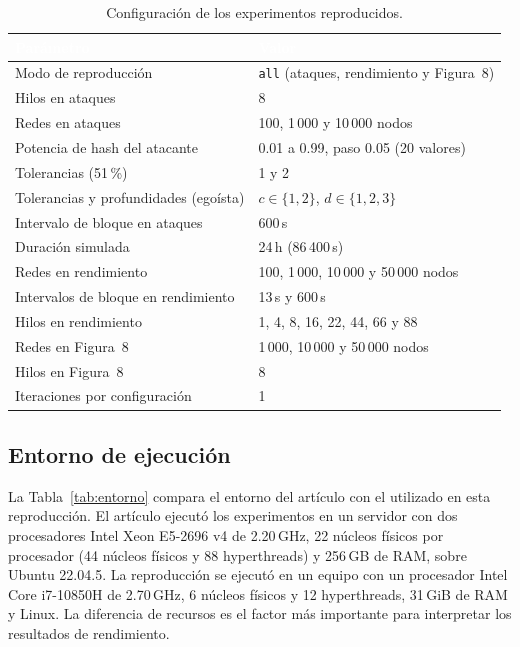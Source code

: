 \documentclass[11pt,a4paper,oneside]{article}
\begin{document}
\begin{table}[H]
\caption{Configuración de los experimentos reproducidos.}
\label{tab:config}
\centering
\small
\renewcommand{\arraystretch}{1.15}
\begin{tabularx}{\textwidth}{lX}
\toprule
\rowcolor{tablehead}
\textcolor{white}{\textbf{Parámetro}} &
\textcolor{white}{\textbf{Valor}} \\
\midrule
Modo de reproducción & \texttt{all} (ataques, rendimiento y Figura~8) \\
Hilos en ataques & 8 \\
Redes en ataques & 100, 1\,000 y 10\,000 nodos \\
Potencia de hash del atacante & 0.01 a 0.99, paso 0.05 (20 valores) \\
Tolerancias (51\,\%) & 1 y 2 \\
Tolerancias y profundidades (egoísta) & $c \in \{1,2\}$, $d \in \{1,2,3\}$ \\
Intervalo de bloque en ataques & 600\,s \\
Duración simulada & 24\,h (86\,400\,s) \\
Redes en rendimiento & 100, 1\,000, 10\,000 y 50\,000 nodos \\
Intervalos de bloque en rendimiento & 13\,s y 600\,s \\
Hilos en rendimiento & 1, 4, 8, 16, 22, 44, 66 y 88 \\
Redes en Figura~8 & 1\,000, 10\,000 y 50\,000 nodos \\
Hilos en Figura~8 & 8 \\
Iteraciones por configuración & 1 \\
\bottomrule
\end{tabularx}
\end{table}

\subsection{Entorno de ejecución}

La Tabla~\ref{tab:entorno} compara el entorno del artículo con el utilizado en esta reproducción. El artículo ejecutó los experimentos en un servidor con dos procesadores Intel Xeon E5-2696 v4 de 2.20\,GHz, 22 núcleos físicos por procesador (44 núcleos físicos y 88 hyperthreads) y 256\,GB de RAM, sobre Ubuntu 22.04.5. La reproducción se ejecutó en un equipo con un procesador Intel Core i7-10850H de 2.70\,GHz, 6 núcleos físicos y 12 hyperthreads, 31\,GiB de RAM y Linux. La diferencia de recursos es el factor más importante para interpretar los resultados de rendimiento.
\end{document}
